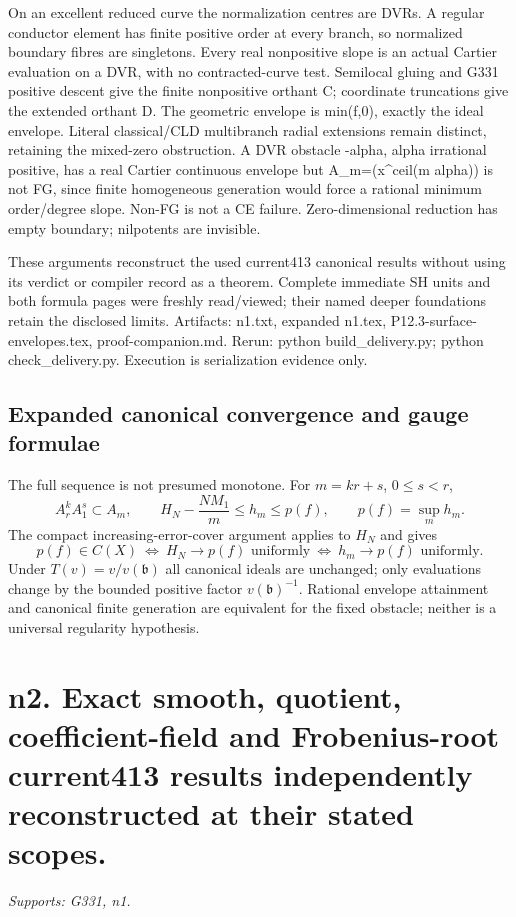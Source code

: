 \documentclass[11pt]{article}
\begin{document}
On an excellent reduced curve the normalization centres are DVRs. A regular conductor element has finite positive order at every branch, so normalized boundary fibres are singletons. Every real nonpositive slope is an actual Cartier evaluation on a DVR, with no contracted-curve test. Semilocal gluing and G331 positive descent give the finite nonpositive orthant C; coordinate truncations give the extended orthant D. The geometric envelope is min(f,0), exactly the ideal envelope. Literal classical/CLD multibranch radial extensions remain distinct, retaining the mixed-zero obstruction. A DVR obstacle -alpha, alpha irrational positive, has a real Cartier continuous envelope but A\_m=(x\textasciicircum{}ceil(m alpha)) is not FG, since finite homogeneous generation would force a rational minimum order/degree slope. Non-FG is not a CE failure. Zero-dimensional reduction has empty boundary; nilpotents are invisible.

These arguments reconstruct the used current413 canonical results without using its verdict or compiler record as a theorem. Complete immediate SH units and both formula pages were freshly read/viewed; their named deeper foundations retain the disclosed limits. Artifacts: n1.txt, expanded n1.tex, P12.3-surface-envelopes.tex, proof-companion.md. Rerun: python build\_delivery.py; python check\_delivery.py. Execution is serialization evidence only.

\subsection*{Expanded canonical convergence and gauge formulae}
The full sequence is not presumed monotone. For $m=kr+s$, $0\le s<r$,
\[
 A_r^k A_1^s\subset A_m,\qquad
 H_N-\frac{NM_1}{m}\le h_m\le p(f),\qquad
 p(f)=\sup_m h_m.
\]
The compact increasing-error-cover argument applies to $H_N$ and gives
\[
 p(f)\in C(X)\ \Longleftrightarrow\ H_N\to p(f)\text{ uniformly}
 \ \Longleftrightarrow\ h_m\to p(f)\text{ uniformly}.
\]
Under $T(v)=v/v(\mathfrak b)$ all canonical ideals are unchanged;
only evaluations change by the bounded positive factor $v(\mathfrak b)^{-1}$.
Rational envelope attainment and canonical finite generation are equivalent
for the fixed obstacle; neither is a universal regularity hypothesis.

\section{n2. Exact smooth, quotient, coefficient-field and Frobenius-root current413 results independently reconstructed at their stated scopes.}
\textit{Supports: G331, n1.}
\end{document}
